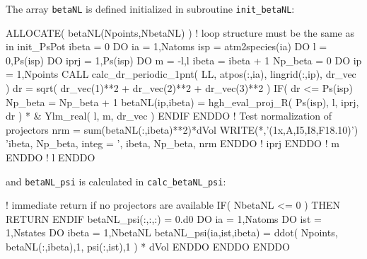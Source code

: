 The array {\tt betaNL} is defined initialized in subroutine {\tt init\_betaNL}:
\begin{fortrancode}
ALLOCATE( betaNL(Npoints,NbetaNL) )
! loop structure must be the same as in init_PsPot
ibeta = 0
DO ia = 1,Natoms
  isp = atm2species(ia)
  DO l = 0,Ps(isp)%
    DO iprj = 1,Ps(isp)%
      DO m = -l,l
        ibeta = ibeta + 1
        Np_beta = 0
        DO ip = 1,Npoints
          CALL calc_dr_periodic_1pnt( LL, atpos(:,ia), lingrid(:,ip), dr_vec )
          dr = sqrt( dr_vec(1)**2 + dr_vec(2)**2 + dr_vec(3)**2 )
          IF( dr <= Ps(isp)%
            Np_beta = Np_beta + 1
            betaNL(ip,ibeta) = hgh_eval_proj_R( Ps(isp), l, iprj, dr ) * &
                               Ylm_real( l, m, dr_vec )
          ENDIF
        ENDDO
        ! Test normalization of projectors
        nrm = sum(betaNL(:,ibeta)**2)*dVol
        WRITE(*,'(1x,A,I5,I8,F18.10)') 'ibeta, Np_beta, integ = ', ibeta, Np_beta, nrm
      ENDDO ! iprj
    ENDDO ! m
  ENDDO ! l
ENDDO
\end{fortrancode}

and {\tt betaNL\_psi} is calculated in {\tt calc\_betaNL\_psi}:
\begin{fortrancode}
! immediate return if no projectors are available
IF( NbetaNL <= 0 ) THEN
  RETURN
ENDIF
betaNL_psi(:,:,:) = 0.d0
DO ia = 1,Natoms
  DO ist = 1,Nstates
    DO ibeta = 1,NbetaNL
      betaNL_psi(ia,ist,ibeta) = ddot( Npoints, betaNL(:,ibeta),1, psi(:,ist),1 ) * dVol
    ENDDO
  ENDDO
ENDDO
\end{fortrancode}


